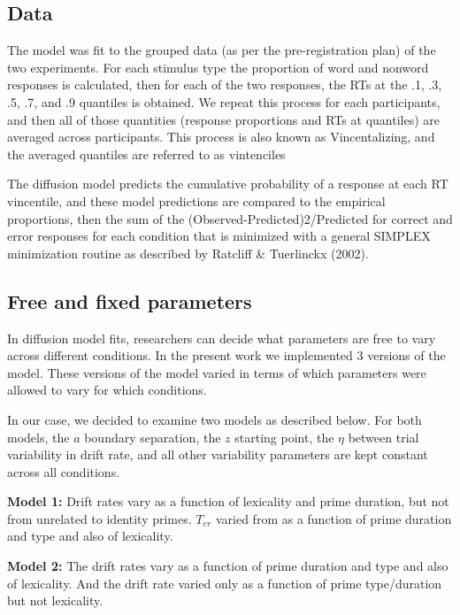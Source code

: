 \begin{appendix}
\hypertarget{data}{%
\subsection{Data}\label{data}}

The model was fit to the grouped data (as per the pre-registration plan)
of the two experiments. For each stimulus type the proportion of word
and nonword responses is calculated, then for each of the two responses,
the RTs at the .1, .3, .5, .7, and .9 quantiles is obtained. We repeat
this process for each participants, and then all of those quantities
(response proportions and RTs at quantiles) are averaged across
participants. This process is also known as Vincentalizing, and the
averaged quantiles are referred to as vintenciles

The diffusion model predicts the cumulative probability of a response at
each RT vincentile, and these model predictions are compared to the
empirical proportions, then the sum of the
(Observed-Predicted)2/Predicted for correct and error responses for each
condition that is minimized with a general SIMPLEX minimization routine
as described by Ratcliff \& Tuerlinckx (2002).

\hypertarget{free-and-fixed-parameters}{%
\subsection{Free and fixed parameters}\label{free-and-fixed-parameters}}

In diffusion model fits, researchers can decide what parameters are free
to vary across different conditions. In the present work we implemented
3 versions of the model. These versions of the model varied in terms of
which parameters were allowed to vary for which conditions.

In our case, we decided to examine two models as described below. For
both models, the \(a\) boundary separation, the \(z\) starting point,
the \(\eta\) between trial variability in drift rate, and all other
variability parameters are kept constant across all conditions.

\textbf{Model 1:} Drift rates vary as a function of lexicality and prime
duration, but not from unrelated to identity primes. \(T_{er}\) varied
from as a function of prime duration and type and also of lexicality.

\textbf{Model 2:} The drift rates vary as a function of prime duration
and type and also of lexicality. And the drift rate varied only as a
function of prime type/duration but not lexicality.


\end{appendix}
